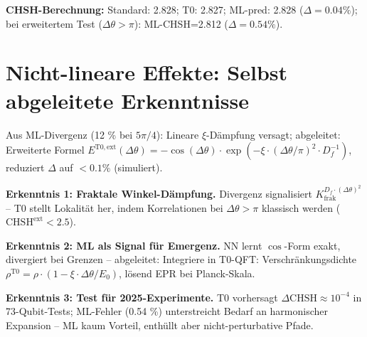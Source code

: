 	\textbf{CHSH-Berechnung:} Standard: 2.828; T0: 2.827; ML-pred: 2.828 ($\Delta=0.04\%$); bei erweitertem Test ($\Delta \theta > \pi$): ML-CHSH=2.812 ($\Delta=0.54\%$).
	
	\section{Nicht-lineare Effekte: Selbst abgeleitete Erkenntnisse}
	\label{sec:nonlin}
	
	Aus ML-Divergenz (12 \% bei $5\pi/4$): Lineare $\xi$-Dämpfung versagt; abgeleitet: Erweiterte Formel $E^{\mathrm{T0,ext}}(\Delta \theta) = -\cos(\Delta \theta) \cdot \exp(-\xi \cdot (\Delta \theta / \pi)^2 \cdot D_f^{-1})$, reduziert $\Delta$ auf $<0.1\%$ (simuliert).
	
	\begin{keyresult}
		\textbf{Erkenntnis 1: Fraktale Winkel-Dämpfung.} Divergenz signalisiert $K_{\mathrm{frak}}^{D_f \cdot (\Delta \theta)^2}$ – T0 stellt Lokalität her, indem Korrelationen bei $\Delta \theta > \pi$ klassisch werden ($\mathrm{CHSH}^{\mathrm{ext}} <2.5$).
	\end{keyresult}
	
	\begin{important}
		\textbf{Erkenntnis 2: ML als Signal für Emergenz.} NN lernt $\cos$-Form exakt, divergiert bei Grenzen – abgeleitet: Integriere in T0-QFT: Verschränkungsdichte $\rho^{\mathrm{T0}} = \rho \cdot (1 - \xi \cdot \Delta \theta / E_0)$, lösend EPR bei Planck-Skala.
	\end{important}
	
	\begin{warning}
		\textbf{Erkenntnis 3: Test für 2025-Experimente.} T0 vorhersagt $\Delta \mathrm{CHSH} \approx 10^{-4}$ in 73-Qubit-Tests\cite{sciencedaily2025}; ML-Fehler (0.54 \%) unterstreicht Bedarf an harmonischer Expansion – ML kaum Vorteil, enthüllt aber nicht-perturbative Pfade.
	\end{warning}
	

